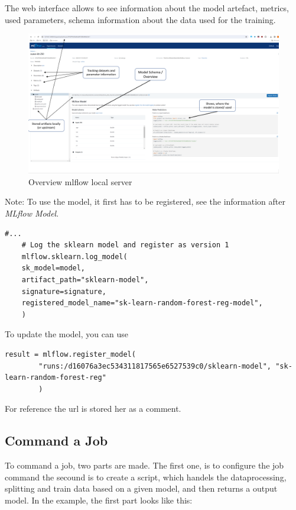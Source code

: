 The web interface allows to see information about the model artefact, metrics, used parameters, schema information about the data used for the training.

\begin{figure}[H]
	\centering
	\includegraphics[scale = 0.4]{attachment/chapter_AML/Scc030}
	\caption{Overview mlflow local server}
\end{figure}

Note: To use the model, it first has to be registered, see the information after \textit{MLflow Model}.
\begin{lstlisting}[language=iPython]
	#...
	# Log the sklearn model and register as version 1
	mlflow.sklearn.log_model(
	sk_model=model,
	artifact_path="sklearn-model",
	signature=signature,
	registered_model_name="sk-learn-random-forest-reg-model",
	)
\end{lstlisting}
To update the model, you can use 
	\begin{lstlisting}[language=iPython, caption={See comment},captionpos=b]
		result = mlflow.register_model(
		"runs:/d16076a3ec534311817565e6527539c0/sklearn-model", "sk-learn-random-forest-reg"
		)
	\end{lstlisting}
	For reference the url is stored her as a comment.
	

\subsection{Command a Job}
To command a job, two parts are made. The first one, is to configure the job command the secound is to create a script, which handels the dataprocessing, splitting and train data based on a given model, and then returns a output model. In the example, the first part looks like this:

